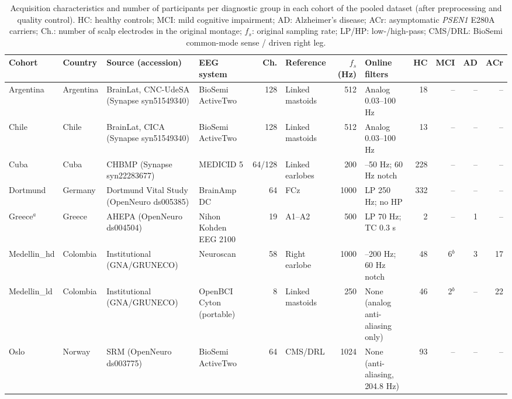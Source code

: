 \documentclass[11pt]{article}
\begin{document}
\begin{landscape}
\begin{table}[p]
\centering
\caption{Acquisition characteristics and number of participants per diagnostic group in each cohort of the pooled dataset (after preprocessing and quality control). HC: healthy controls; MCI: mild cognitive impairment; AD: Alzheimer's disease; ACr: asymptomatic \textit{PSEN1} E280A carriers; Ch.: number of scalp electrodes in the original montage; $f_s$: original sampling rate; LP/HP: low-/high-pass; CMS/DRL: BioSemi common-mode sense / driven right leg.}
\label{tab:acquisition}
\scriptsize
\setlength{\tabcolsep}{3pt}
\renewcommand{\arraystretch}{1.25}
\begin{tabularx}{\linewidth}{@{}l l >{\raggedright\arraybackslash}X >{\raggedright\arraybackslash}X r l r >{\raggedright\arraybackslash}X r r r r@{}}
\toprule
\textbf{Cohort} & \textbf{Country} & \textbf{Source (accession)} & \textbf{EEG system} & \textbf{Ch.} & \textbf{Reference} & \textbf{$f_s$ (Hz)} & \textbf{Online filters} & \textbf{HC} & \textbf{MCI} & \textbf{AD} & \textbf{ACr} \\
\midrule
Argentina & Argentina & BrainLat, CNC-UdeSA \cite{Prado2023} (Synapse syn51549340) & BioSemi ActiveTwo & 128 & Linked mastoids & 512 & Analog 0.03--100 Hz & 18 & -- & -- & -- \\
Chile & Chile & BrainLat, CICA \cite{Prado2023} (Synapse syn51549340) & BioSemi ActiveTwo & 128 & Linked mastoids & 512 & Analog 0.03--100 Hz & 13 & -- & -- & -- \\
Cuba & Cuba & CHBMP \cite{ValdesSosa2021} (Synapse syn22283677) & MEDICID 5 & 64/128 & Linked earlobes & 200 & 0.5--50 Hz; 60 Hz notch & 228 & -- & -- & -- \\
Dortmund & Germany & Dortmund Vital Study \cite{Getzmann2024} (OpenNeuro ds005385) & BrainAmp DC & 64 & FCz & 1000 & LP 250 Hz; no HP & 332 & -- & -- & -- \\
Greece$^{a}$ & Greece & AHEPA \cite{Miltiadous2023} (OpenNeuro ds004504) & Nihon Kohden EEG 2100 & 19 & A1--A2 & 500 & LP 70 Hz; TC 0.3 s & 2 & -- & 1 & -- \\
Medellin\_hd & Colombia & Institutional (GNA/GRUNECO) & Neuroscan & 58 & Right earlobe & 1000 & 0.05--200 Hz; 60 Hz notch & 48 & 6$^{b}$ & 3 & 17 \\
Medellin\_ld & Colombia & Institutional (GNA/GRUNECO) & OpenBCI Cyton (portable) & 8 & Linked mastoids & 250 & None (analog anti-aliasing only) & 46 & 2$^{b}$ & -- & 22 \\
Oslo & Norway & SRM \cite{HatlestadHall2022} (OpenNeuro ds003775) & BioSemi ActiveTwo & 64 & CMS/DRL & 1024 & None (anti-aliasing, 204.8 Hz) & 93 & -- & -- & -- \\

\end{tabularx}
\end{table}
\end{landscape}
\end{document}
